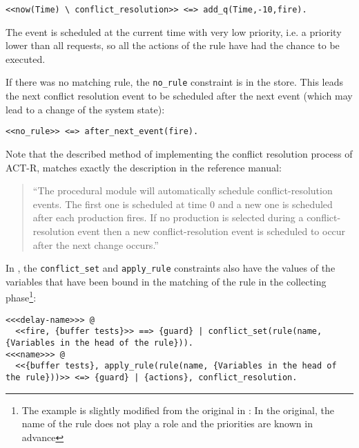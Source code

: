 \begin{lstlisting}
<<now(Time) \ conflict_resolution>> <=> add_q(Time,-10,fire).
\end{lstlisting}

The event is scheduled at the current time with very low priority, i.e. a priority lower than all requests, so all the actions of the rule have had the chance to be executed.

If there was no matching rule, the \lstinline|no_rule| constraint is in the store. This leads the next conflict resolution event to be scheduled after the next event (which may lead to a change of the system state):

\begin{lstlisting}
<<no_rule>> <=> after_next_event(fire).
\end{lstlisting}

Note that the described method of implementing the conflict resolution process of ACT-R, matches exactly the description in the reference manual:

\begin{quote}
``The procedural module will automatically schedule conflict-resolution events. The first one is
scheduled at time 0 and a new one is scheduled after each production fires. If no production is
selected during a conflict-resolution event then a new conflict-resolution event is scheduled to occur
after the next change occurs.'' \cite[156]{actr_reference}
\end{quote}

In \cite{fru_chr_book_2009}, the \lstinline|conflict_set| and \lstinline|apply_rule| constraints also have the values of the variables that have been bound in the matching of the rule in the collecting phase\footnote{The example is slightly modified from the original in \cite{fru_chr_book_2009}: In the original, the name of the rule does not play a role and the priorities are known in advance}: 

\begin{lstlisting}
<<<delay-name>>> @
  <<fire, {buffer tests}>> ==> {guard} | conflict_set(rule(name, {Variables in the head of the rule})).
<<<name>>> @
  <<{buffer tests}, apply_rule(rule(name, {Variables in the head of the rule}))>> <=> {guard} | {actions}, conflict_resolution.
\end{lstlisting}


